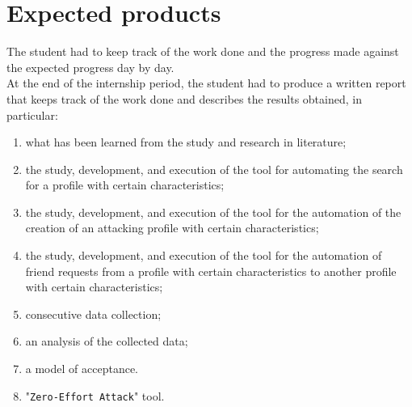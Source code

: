 \section{Expected products}
The student had to keep track of the work done and the progress made against the expected progress day by day.\\
At the end of the internship period, the student had to produce a written report that keeps track of the work done and describes the results obtained, in particular:
\begin{enumerate}
	\item what has been learned from the study and research in literature; 
	\item the study, development, and execution of the tool for automating the search for a profile with certain characteristics;
	\item the study, development, and execution of the tool for the automation of the creation of an attacking profile with certain characteristics;
	\item the study, development, and execution of the tool for the automation of friend requests from a profile with certain characteristics to another profile with certain characteristics;	
	\item consecutive data collection; 
	\item an analysis of the collected data; 
	\item a model of acceptance.
	\item "\texttt{Zero-Effort Attack}" tool.
\end{enumerate}

